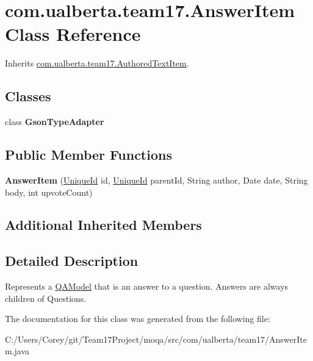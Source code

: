 \hypertarget{classcom_1_1ualberta_1_1team17_1_1_answer_item}{\section{com.\+ualberta.\+team17.\+Answer\+Item Class Reference}
\label{classcom_1_1ualberta_1_1team17_1_1_answer_item}
}


Inherits \hyperlink{classcom_1_1ualberta_1_1team17_1_1_authored_text_item}{com.\+ualberta.\+team17.\+Authored\+Text\+Item}.

\subsection*{Classes}
\begin{DoxyCompactItemize}
\item 
class {\bfseries Gson\+Type\+Adapter}
\end{DoxyCompactItemize}
\subsection*{Public Member Functions}
\begin{DoxyCompactItemize}
\item 
\hypertarget{classcom_1_1ualberta_1_1team17_1_1_answer_item_a191dae4ea08c88cdfa9278b2aaeec49e}{{\bfseries Answer\+Item} (\hyperlink{classcom_1_1ualberta_1_1team17_1_1_unique_id}{Unique\+Id} id, \hyperlink{classcom_1_1ualberta_1_1team17_1_1_unique_id}{Unique\+Id} parent\+Id, String author, Date date, String body, int upvote\+Count)}\label{classcom_1_1ualberta_1_1team17_1_1_answer_item_a191dae4ea08c88cdfa9278b2aaeec49e}

\end{DoxyCompactItemize}
\subsection*{Additional Inherited Members}


\subsection{Detailed Description}
Represents a \hyperlink{classcom_1_1ualberta_1_1team17_1_1_q_a_model}{Q\+A\+Model} that is an answer to a question. Answers are always children of Questions. 

The documentation for this class was generated from the following file\+:\begin{DoxyCompactItemize}
\item 
C\+:/\+Users/\+Corey/git/\+Team17\+Project/moqa/src/com/ualberta/team17/Answer\+Item.\+java\end{DoxyCompactItemize}
